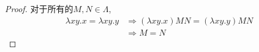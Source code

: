 \begin{proof}
    对于所有的$M,N\in\Lambda$,
	\begin{align*}
		\lambda xy.x=\lambda xy.y&\Rightarrow (\lambda xy.x)MN=(\lambda xy.y)MN\\
		&\Rightarrow M=N
	\end{align*}
\end{proof}